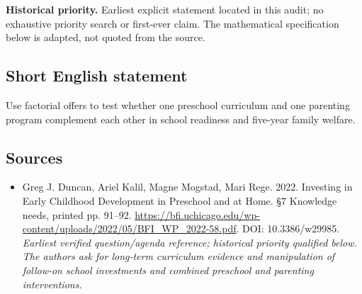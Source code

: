 \documentclass[11pt]{article}
\begin{document}
\par\textbf{Historical priority.} Earliest explicit statement located in this audit; no exhaustive priority search or first-ever claim. The mathematical specification below is adapted, not quoted from the source.

\subsection{Short English statement}
Use factorial offers to test whether one preschool curriculum and one parenting program complement each other in school readiness and five-year family welfare.

\subsection{Sources}
\begin{itemize}\raggedright
\item[\textnormal{[S1]}]\hypertarget{source:30007733:1}{} Greg J. Duncan, Ariel Kalil, Magne Mogstad, Mari Rege. 2022. Investing in Early Childhood Development in Preschool and at Home. §7 Knowledge needs, printed pp. 91–92.
\url{https://bfi.uchicago.edu/wp-content/uploads/2022/05/BFI_WP_2022-58.pdf}.
DOI: 10.3386/w29985.
{\small\textit{Earliest verified question/agenda reference; historical priority qualified below. The authors ask for long-term curriculum evidence and manipulation of follow-on school investments and combined preschool and parenting interventions.}}
\end{itemize}
\end{document}
